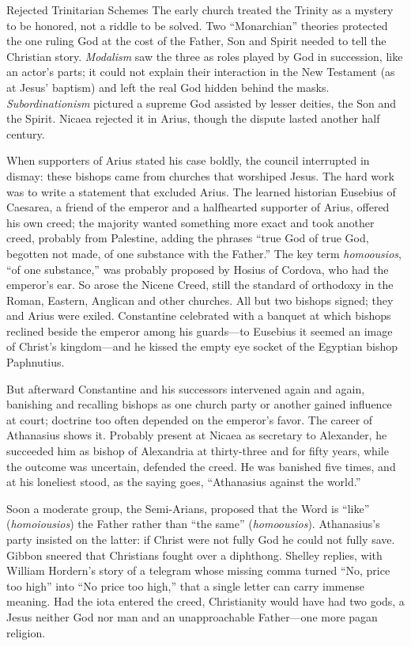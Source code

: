 \begin{sidebox}{Rejected Trinitarian Schemes}
The early church treated the Trinity as a mystery to be honored, not a riddle to be solved. Two
``Monarchian'' theories protected the one ruling God at the cost of the Father, Son and Spirit needed
to tell the Christian story. \emph{Modalism} saw the three as roles played by God in succession, like
an actor's parts; it could not explain their interaction in the New Testament (as at Jesus' baptism)
and left the real God hidden behind the masks. \emph{Subordinationism} pictured a supreme God assisted
by lesser deities, the Son and the Spirit. Nicaea rejected it in Arius, though the dispute lasted
another half century.
\end{sidebox}

When supporters of Arius stated his case boldly, the council interrupted in dismay: these bishops came
from churches that worshiped Jesus. The hard work was to write a statement that excluded Arius. The
learned historian Eusebius of Caesarea, a friend of the emperor and a halfhearted supporter of Arius,
offered his own creed; the majority wanted something more exact and took another creed, probably from
Palestine, adding the phrases ``true God of true God, begotten not made, of one substance with the
Father.'' The key term \emph{homoousios}, ``of one substance,'' was probably proposed by Hosius of
Cordova, who had the emperor's ear. So arose the Nicene Creed, still the standard of orthodoxy in the
Roman, Eastern, Anglican and other churches. All but two bishops signed; they and Arius were exiled.
Constantine celebrated with a banquet at which bishops reclined beside the emperor among his guards---to
Eusebius it seemed an image of Christ's kingdom---and he kissed the empty eye socket of the
Egyptian bishop Paphnutius.

But afterward Constantine and his successors intervened again and again, banishing and recalling
bishops as one church party or another gained influence at court; doctrine too often depended on the
emperor's favor. The career of Athanasius shows it. Probably present at Nicaea as secretary to
Alexander, he succeeded him as bishop of Alexandria at thirty-three and for fifty years, while the
outcome was uncertain, defended the creed. He was banished five times, and at his loneliest stood, as
the saying goes, ``Athanasius against the world.''

Soon a moderate group, the Semi-Arians, proposed that the Word is ``like'' (\emph{homoiousios}) the
Father rather than ``the same'' (\emph{homoousios}). Athanasius's party insisted on the latter: if
Christ were not fully God he could not fully save. Gibbon sneered that Christians fought over a
diphthong. Shelley replies, with William Hordern's story of a telegram whose missing comma turned
``No, price too high'' into ``No price too high,'' that a single letter can carry immense meaning. Had
the iota entered the creed, Christianity would have had two gods, a Jesus neither God nor man and an
unapproachable Father---one more pagan religion.

